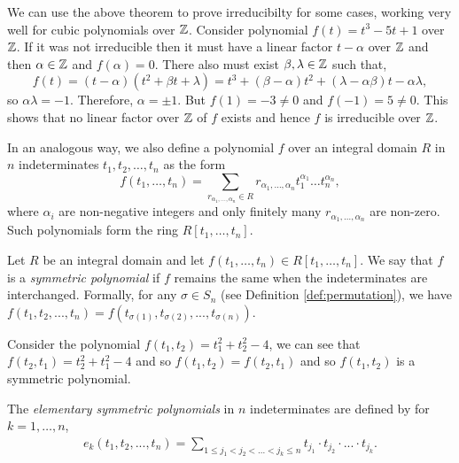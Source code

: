 \begin{example}
    We can use the above theorem to prove irreducibilty for some cases, working very well for cubic polynomials over $\mathbb Z$. Consider polynomial $f(t) = t^3 -5 t + 1$ over $\mathbb Z$. If it was not irreducible then it must have a linear factor $t - \alpha$ over $\mathbb Z$ and then $\alpha \in \mathbb Z$ and $f(\alpha) = 0$. There also must exist $\beta, \lambda \in \mathbb Z$ such that,
    $$
    f(t) = (t-\alpha)(t^2 + \beta t + \lambda) = t^3 + (\beta - \alpha)t^2 + (\lambda - \alpha \beta)t - \alpha \lambda,
    $$
    so $\alpha \lambda = -1$. Therefore, $\alpha = \pm 1$. But $f(1) = -3 \neq 0$ and $f(-1) = 5 \neq 0$. This shows that no linear factor over $\mathbb Z$ of $f$ exists and hence $f$ is irreducible over $\mathbb Z$.
\end{example}




In an analogous way, we also define a polynomial $f$ over an integral domain $R$ in $n$ indeterminates $t_1, t_2, \dots, t_n$ as the form 
$$
f(t_1, \dots, t_n) = \sum _{ r_{\alpha_1, \dots, \alpha_n} \in R}  r_{\alpha_1, \dots, \alpha_n} t_1^{\alpha_1} \dots t_n ^{\alpha_n},
$$
where $\alpha_i$ are non-negative integers and only finitely many $r_{\alpha_1, \dots, \alpha_n}$ are non-zero. Such polynomials form the ring $R[t_1, \dots, t_n]$.

\begin{definition}
	Let $R$ be an integral domain and let $f(t_1, \dots, t_n) \in R[t_1, \dots, t_n]$. We say that $f$ is
    a \textit{symmetric polynomial} if $f$ remains the same when the indeterminates are interchanged. 
    Formally, for any $\sigma \in S_n$ (see Definition \ref{def:permutation}), we have $f(t_1,t_2,...,t_n) = f(t_{\sigma(1)},t_{\sigma(2)},...,t_{\sigma(n)})$.
\end{definition}

\begin{example}
    Consider the polynomial 
    $f(t_1,t_2)=t_1^2+t_2^2-4$, we can see that $f(t_2,t_1)=t_2^2+t_1^2-4$ and so $f(t_1,t_2)=f(t_2,t_1)$ and so $f(t_1,t_2)$ is a symmetric polynomial.
\end{example}

\begin{definition}
    The \textit{elementary symmetric polynomials} in $n$ indeterminates are defined by for $k = 1, \dots, n$,
    \begin{align*}
    e_k(t_1,t_2,...,t_n) = \sum_{1\leq j_1<j_2<...<j_k\leq n} t_{j_1}\cdot t_{j_2} \cdot ... \cdot t_{j_k}.
    \end{align*}
\end{definition}

